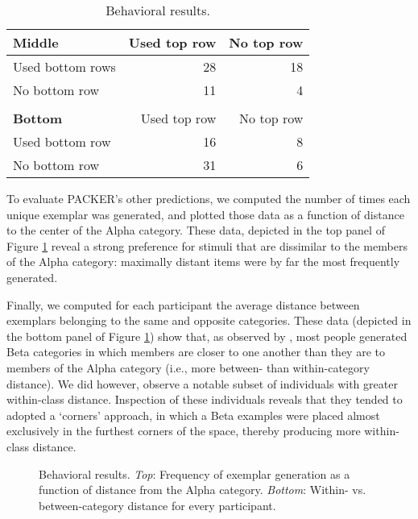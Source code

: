 \documentclass[10pt,letterpaper]{article}
\newcommand\inputpgf[2]{{
\let\pgfimageWithoutPath\pgfimage
\renewcommand{\pgfimage}[2][]{\pgfimageWithoutPath[##1]{#1/##2}}

}}
\begin{document}
\begin{table}
\begin{center} 
\caption{Behavioral results.} 
\label{table:subset-table} 
\vskip 0.12in
\begin{tabular}{ l r r}
    \textbf{Middle}         & Used top row & No top row \\
    \hline
    Used bottom rows       &  28 & 18  \\
    No bottom row          &  11 &  4  \\
    \\
    \textbf{Bottom}         & Used top row & No top row \\
    \hline
    Used bottom row        & 16 & 8 \\
    No bottom row          & 31 & 6 \\
\end{tabular}
\end{center} 
\end{table}

To evaluate PACKER's other predictions, we computed the number of times each unique exemplar was generated, and plotted those data as a function of distance to the center of the Alpha category. These data, depicted in the top panel of Figure \ref{fig:distance.figs} reveal a strong preference for stimuli that are dissimilar to the members of the Alpha category: maximally distant items were by far the most frequently generated. 

Finally, we computed for each participant the average distance between exemplars belonging to the same and opposite categories. These data (depicted in the bottom panel of Figure \ref{fig:distance.figs}) show that, as observed by \citet{ward1994structured}, most people generated Beta categories in which members are closer to one another than they are to members of the Alpha category (i.e., more between- than within-category distance). We did however, observe a notable subset of individuals with greater within-class distance. Inspection of these individuals reveals that they tended to adopted a `corners' approach, in which a Beta examples were placed almost exclusively in the furthest corners of the space, thereby producing more within-class distance.

\begin{figure}
    \begin{center}
    \inputpgf{figs/}{distance.figs.pgf}
    \caption{Behavioral results. \textit{Top}: Frequency of exemplar generation as a function of distance from the Alpha category. \textit{Bottom}: Within- vs. between-category distance for every participant. }
    \label{fig:distance.figs}
    \end{center}
\end{figure}
\end{document}
